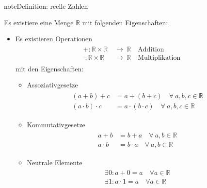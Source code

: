 \documentclass[letterpaper,10pt,english]{jupyterBook}
\begin{document}
\begin{sphinxadmonition}{note}{Definition: reelle Zahlen}

Es existiere eine Menge \(\mathbb{R}\) mit folgenden Eigenschaften:
\begin{itemize}
\item {} 
Es existieren Operationen
\begin{equation*}
\begin{split}\begin{split}  + : \mathbb{R} \times \mathbb{R} \ & \to \ \mathbb{R}\quad\text{Addition}\\
  \cdot : \mathbb{R} \times \mathbb{R} \ & \to \ \mathbb{R}\quad\text{Multiplikation}\end{split}\end{split}
\end{equation*}
mit den Eigenschaften:
\begin{itemize}
\item {} 
Assoziativgesetze
\begin{equation*}
\begin{split}\begin{split}
    (a+b) + c & = a + (b+c)\quad \forall\ a,b,c \in \mathbb{R}\\
    (a\cdot b) \cdot c & = a \cdot (b\cdot c)\quad \forall\ a,b,c \in \mathbb{R}
    \end{split}\end{split}
\end{equation*}
\item {} 
Kommutativgesetze
\begin{equation*}
\begin{split}\begin{split}
    a + b & = b + a \quad \forall\ a,b \in \mathbb{R}\\
    a\cdot b & = b \cdot a\quad \forall\ a,b \in \mathbb{R}
    \end{split}\end{split}
\end{equation*}
\item {} 
Neutrale Elemente
\begin{equation*}
\begin{split}\begin{split}
    \exists 0: a + 0 = a\quad \forall a \in \mathbb{R}\\
    \exists 1: a \cdot 1 = a\quad \forall a \in \mathbb{R}
    \end{split}\end{split}
\end{equation*}

\end{itemize}
\end{itemize}
\end{sphinxadmonition}
\end{document}
